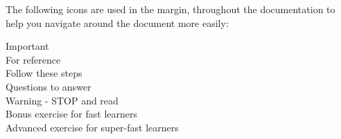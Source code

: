 The following icons are used in the margin, throughout the documentation to help you navigate around
the document more easily:

\hspace*{.2cm} Important\\
\hspace*{.2cm} For reference\\
\hspace*{.2cm} Follow these steps\\
\hspace*{.2cm} Questions to answer\\
\hspace*{.2cm} Warning - STOP and read\\
\hspace*{.2cm} Bonus exercise for fast learners\\
\hspace*{.2cm} Advanced exercise for super-fast learners\\
